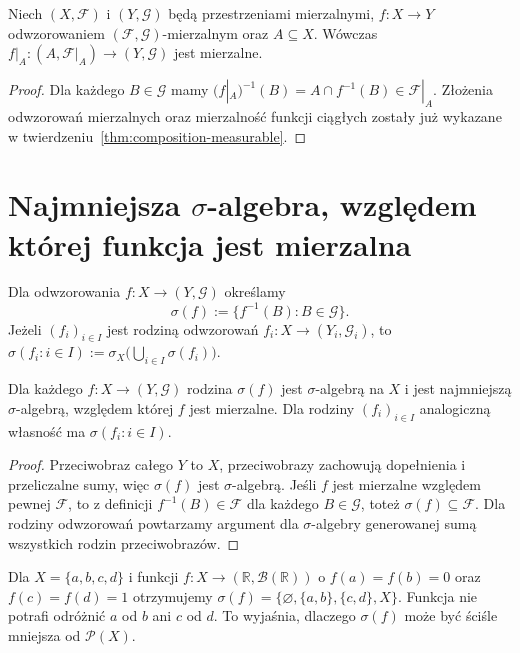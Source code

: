 \begin{twierdzenie}
\label{thm:restriction-meas-5}
Niech $(X,\mathcal F)$ i $(Y,\mathcal G)$ będą przestrzeniami
mierzalnymi, $f:X\to Y$ odwzorowaniem
$(\mathcal F,\mathcal G)$-mierzalnym oraz $A\subseteq X$.
Wówczas $f|_A:(A,\mathcal F|_A)\to(Y,\mathcal G)$ jest mierzalne.
\end{twierdzenie}
\begin{proof}
Dla każdego $B\in\mathcal G$ mamy
$(f|_A)^{-1}(B)=A\cap f^{-1}(B)\in\mathcal F|_A$.
Złożenia odwzorowań mierzalnych oraz mierzalność funkcji
ciągłych zostały już wykazane w twierdzeniu~\ref{thm:composition-measurable}.
\end{proof}

\section{Najmniejsza \texorpdfstring{$\sigma$}{sigma}-algebra, względem której funkcja jest mierzalna}

\begin{definicja}
\label{def:sigma-of-function}
Dla odwzorowania $f:X\to(Y,\mathcal G)$ określamy
\[
\sigma(f):=\{f^{-1}(B):B\in\mathcal G\}.
\]
Jeżeli $(f_i)_{i\in I}$ jest rodziną odwzorowań
$f_i:X\to(Y_i,\mathcal G_i)$, to
$\sigma(f_i:i\in I):=\sigma_X\bigl(\bigcup_{i\in I}\sigma(f_i)\bigr)$.
\end{definicja}

\begin{twierdzenie}
\label{thm:initial-sigma}
Dla każdego $f:X\to(Y,\mathcal G)$ rodzina $\sigma(f)$
jest $\sigma$-algebrą na $X$ i jest najmniejszą
$\sigma$-algebrą, względem której $f$ jest mierzalne.
Dla rodziny $(f_i)_{i\in I}$ analogiczną własność
ma $\sigma(f_i:i\in I)$.
\end{twierdzenie}
\begin{proof}
Przeciwobraz całego $Y$ to $X$, przeciwobrazy zachowują
dopełnienia i przeliczalne sumy, więc $\sigma(f)$
jest $\sigma$-algebrą. Jeśli $f$ jest mierzalne
względem pewnej $\mathcal F$, to z definicji
$f^{-1}(B)\in\mathcal F$ dla każdego $B\in\mathcal G$,
toteż $\sigma(f)\subseteq\mathcal F$.
Dla rodziny odwzorowań powtarzamy argument dla
$\sigma$-algebry generowanej sumą wszystkich
rodzin przeciwobrazów.
\end{proof}

\begin{przyklad}
Dla $X=\{a,b,c,d\}$ i funkcji $f:X\to(\mathbb R,\mathcal B(\mathbb R))$ o
$f(a)=f(b)=0$ oraz $f(c)=f(d)=1$ otrzymujemy
$\sigma(f)=\{\varnothing,\{a,b\},\{c,d\},X\}$.
Funkcja nie potrafi odróżnić $a$ od $b$ ani $c$ od $d$.
To wyjaśnia, dlaczego $\sigma(f)$ może być ściśle mniejsza
od $\mathcal P(X)$.
\end{przyklad}

